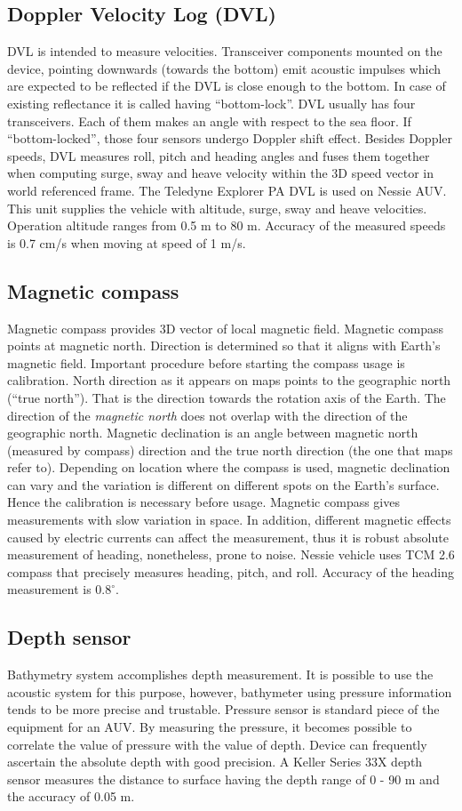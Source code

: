 \subsection{Doppler Velocity Log (DVL)}
DVL is intended to measure  velocities. Transceiver components mounted on the device, pointing downwards (towards the bottom) emit acoustic impulses which are expected to be reflected if the DVL is close enough to the bottom. In case of existing reflectance it is called having ``bottom-lock''. DVL usually has four transceivers. Each of them makes an angle with respect to the sea floor. If ``bottom-locked'', those four sensors undergo Doppler shift effect. Besides Doppler speeds, DVL measures roll, pitch and heading angles and fuses them together when computing surge, sway and heave velocity within the 3D speed vector in world referenced frame. The Teledyne Explorer PA DVL is used on Nessie AUV. This unit supplies the vehicle with altitude, surge, sway and heave velocities. Operation altitude ranges from 0.5 m to 80 m. Accuracy of the measured speeds is 0.7 cm/s when moving at speed of 1 m/s.

\subsection{Magnetic compass} 
Magnetic compass provides 3D vector of local magnetic field. Magnetic compass points at magnetic north. Direction is determined so that it aligns with Earth's magnetic field. Important procedure before starting the compass usage is calibration. North direction as it appears on maps points to the geographic north (``true north''). That is the direction towards the rotation axis of the Earth. The direction of the \textit{magnetic north} does not overlap with the direction of the geographic north. Magnetic declination is an angle between magnetic north (measured by compass) direction and the true north direction (the one that maps refer to). Depending on location where the compass is used, magnetic declination can vary and the variation is different on different spots on the Earth's surface. Hence the calibration is necessary before usage. Magnetic compass gives measurements with slow variation in space. In addition, different magnetic effects caused by electric currents can affect the measurement, thus it is robust absolute measurement of heading, nonetheless, prone to noise. Nessie vehicle uses TCM 2.6 compass that precisely measures heading, pitch, and roll. Accuracy of the heading measurement is $0.8^{\circ}$.
\subsection{Depth sensor} 
Bathymetry system accomplishes depth measurement. It is possible to use the acoustic system for this purpose, however, bathymeter using pressure information tends to be more precise and trustable. Pressure sensor is standard piece of the equipment for an AUV. By measuring the pressure, it becomes possible to correlate the value of pressure with the value of depth. Device can frequently ascertain the absolute depth with good precision. A Keller Series 33X depth sensor measures the distance to surface having the depth range of 0 - 90 m and the accuracy of 0.05 m. 
